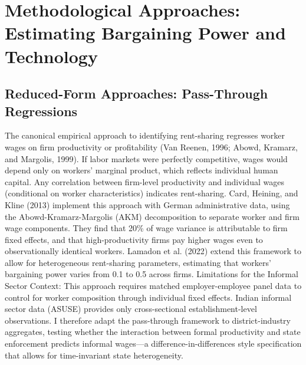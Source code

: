 \section{Methodological Approaches: Estimating Bargaining Power and Technology}
\subsection{Reduced-Form Approaches: Pass-Through Regressions}
The canonical empirical approach to identifying rent-sharing regresses worker wages on firm productivity or profitability (Van Reenen, 1996; Abowd, Kramarz, and Margolis, 1999). If labor markets were perfectly competitive, wages would depend only on workers' marginal product, which reflects individual human capital. Any correlation between firm-level productivity and individual wages (conditional on worker characteristics) indicates rent-sharing.
Card, Heining, and Kline (2013) implement this approach with German administrative data, using the Abowd-Kramarz-Margolis (AKM) decomposition to separate worker and firm wage components. They find that 20\% of wage variance is attributable to firm fixed effects, and that high-productivity firms pay higher wages even to observationally identical workers. Lamadon et al. (2022) extend this framework to allow for heterogeneous rent-sharing parameters, estimating that workers' bargaining power varies from 0.1 to 0.5 across firms.
Limitations for the Informal Sector Context: This approach requires matched employer-employee panel data to control for worker composition through individual fixed effects. Indian informal sector data (ASUSE) provides only cross-sectional establishment-level observations. I therefore adapt the pass-through framework to district-industry aggregates, testing whether the interaction between formal productivity and state enforcement predicts informal wages—a difference-in-differences style specification that allows for time-invariant state heterogeneity.
